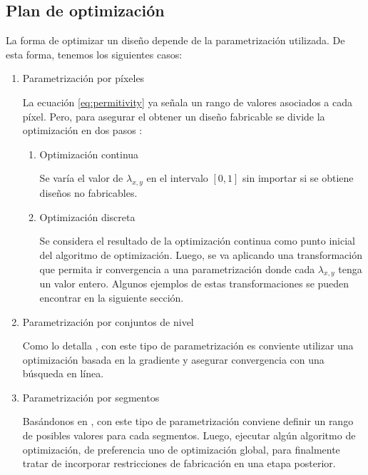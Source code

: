 \subsection{Plan de optimización}

La forma de optimizar un diseño depende de la parametrización utilizada. De esta forma, tenemos los siguientes casos:

\begin{enumerate}


\item{Parametrización por píxeles}


La ecuación \ref{eq:permitivity} ya señala un rango de valores asociados a cada píxel. 
Pero, para asegurar el obtener un diseño fabricable se divide la optimización en dos pasos \citep{Su2020}:

  \begin{enumerate}
  \item Optimización continua
  
  Se varía el valor de $\lambda_{x,y}$ en el intervalo $[0, 1]$ sin importar si se obtiene diseños no fabricables.

  \item Optimización discreta

  Se considera el resultado de la optimización continua como punto inicial del algoritmo de optimización.
  Luego, se va aplicando una transformación que permita ir convergencia a una parametrización donde cada $\lambda_{x, y}$ tenga un valor entero.
  Algunos ejemplos de estas transformaciones se pueden encontrar en la siguiente sección.

  \end{enumerate}

\item{Parametrización por conjuntos de nivel}

Como lo detalla \cite{Piggott2017}, con este tipo de parametrización es conviente utilizar una optimización basada en la gradiente y
asegurar convergencia con una búsqueda en línea.

\item{Parametrización por segmentos}

Basándonos en \cite{Prosopio-Galarza2019}, con este tipo de parametrización conviene definir un rango de posibles valores para cada segmentos.
Luego, ejecutar algún algoritmo de optimización, de preferencia uno de optimización global, para finalmente tratar de incorporar restricciones de fabricación en una etapa posterior.

\end{enumerate}

